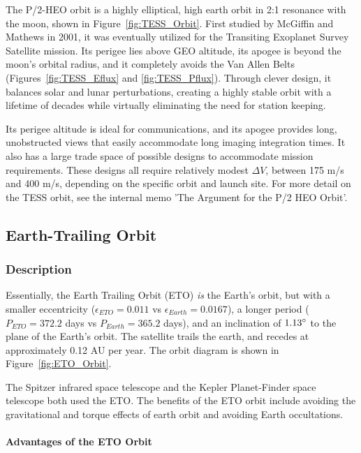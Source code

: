 \documentclass[11pt]{article}
\begin{document}
The P/2-HEO orbit is a highly elliptical, high earth orbit in 2:1 resonance with the moon, shown in Figure~\ref{fig:TESS_Orbit}. First studied by McGiffin and Mathews in 2001, it was eventually utilized for the Transiting Exoplanet Survey Satellite mission. Its perigee lies above GEO altitude,  its apogee is beyond the moon's orbital radius, and it completely avoids the Van Allen Belts (Figures~\ref{fig:TESS_Eflux} and \ref{fig:TESS_Pflux}). Through clever design, it balances solar and lunar perturbations, creating a highly stable orbit with a lifetime of decades while virtually eliminating the need for station keeping. 

Its perigee altitude is ideal for communications, and its apogee provides long, unobstructed views that easily accommodate long imaging integration times. It also has a large trade space of possible designs to accommodate mission requirements. These designs all require relatively modest $\Delta V$, between 175 \unit{m/s} and 400 \unit{m/s}, depending on the specific orbit and launch site.\cite{mcgiffin01} For more detail on the TESS orbit, see the internal memo 'The Argument for the P/2 HEO Orbit'.

\subsection{Earth-Trailing Orbit}

\subsubsection{Description}

Essentially, the Earth Trailing Orbit (ETO) \textit{is} the Earth's orbit, but with a smaller eccentricity ($\epsilon_{ETO}=0.011$ vs $\epsilon_{Earth}=0.0167$), a longer period ($P_{ETO}=372.2$ days vs $P_{Earth}=365.2$ days), and an inclination of $1.13\degree$ to the plane of the Earth's orbit. The satellite trails the earth, and recedes at approximately 0.12 AU per year. The orbit diagram is shown in Figure~\ref{fig:ETO_Orbit}.

The Spitzer infrared space telescope and the Kepler Planet-Finder space telescope both used the ETO. The benefits of the ETO orbit include avoiding the gravitational and torque effects of earth orbit and avoiding Earth occultations. 

\paragraph{Advantages of the ETO Orbit}
\end{document}
